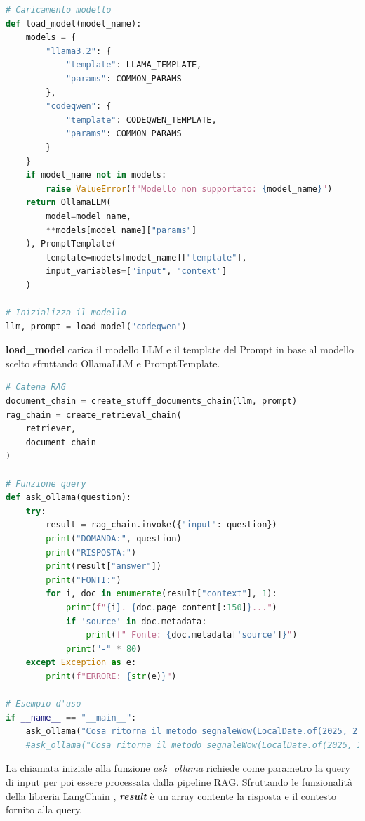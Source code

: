 \documentclass[12pt,a4paper,openright,twoside]{book}
\begin{document}
\begin{lstlisting}[language=Python, caption={Caricamento del modello}, label={lst:Caricamento del modello}]
    # Caricamento modello
def load_model(model_name):
    models = {
        "llama3.2": {
            "template": LLAMA_TEMPLATE,
            "params": COMMON_PARAMS
        },
        "codeqwen": {
            "template": CODEQWEN_TEMPLATE,
            "params": COMMON_PARAMS
        }
    }
    if model_name not in models:
        raise ValueError(f"Modello non supportato: {model_name}")
    return OllamaLLM(
        model=model_name,
        **models[model_name]["params"]
    ), PromptTemplate(
        template=models[model_name]["template"],
        input_variables=["input", "context"]
    )

# Inizializza il modello
llm, prompt = load_model("codeqwen")
\end{lstlisting}
\textbf{load\_model} carica il modello LLM e il template del Prompt in base al modello scelto sfruttando OllamaLLM e PromptTemplate.
\begin{lstlisting}[language=Python, caption={Catena RAG}, label={lst:Catena RAG}]
# Catena RAG
document_chain = create_stuff_documents_chain(llm, prompt)
rag_chain = create_retrieval_chain(
    retriever,
    document_chain
)

# Funzione query
def ask_ollama(question):
    try:
        result = rag_chain.invoke({"input": question})
        print("DOMANDA:", question)
        print("RISPOSTA:")
        print(result["answer"])
        print("FONTI:")
        for i, doc in enumerate(result["context"], 1):
            print(f"{i}. {doc.page_content[:150]}...")
            if 'source' in doc.metadata:
                print(f" Fonte: {doc.metadata['source']}")
            print("-" * 80)
    except Exception as e:
        print(f"ERRORE: {str(e)}")

# Esempio d'uso
if __name__ == "__main__":
    ask_ollama("Cosa ritorna il metodo segnaleWow(LocalDate.of(2025, 2, 14)) che utilizza la funzione getMessaggioMagico() della libreria DateUtilCustom?")
    #ask_ollama("Cosa ritorna il metodo segnaleWow(LocalDate.of(2025, 2, 14))?")

\end{lstlisting}
La chiamata iniziale alla funzione \emph{ask\_ollama} richiede come parametro la query di input per poi essere processata dalla pipeline RAG.
Sfruttando le funzionalità della libreria LangChain \cite{langchain-retrieval-chain}, \textbf{\emph{result}} è un array contente la risposta e il contesto fornito alla query.
\end{document}
